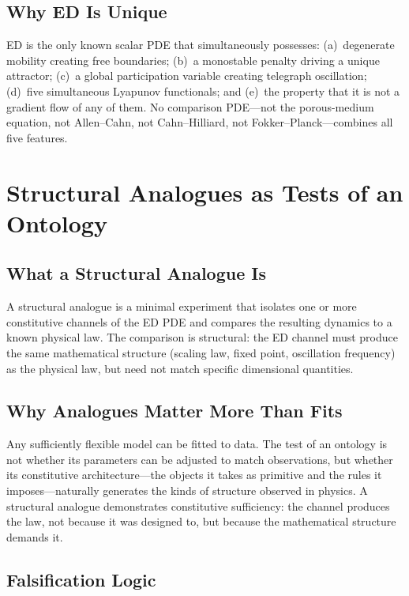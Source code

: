 \documentclass[11pt]{article}
\begin{document}
\subsection{Why ED Is Unique}

ED is the only known scalar PDE that simultaneously possesses: (a)~degenerate mobility creating free boundaries; (b)~a monostable penalty driving a unique attractor; (c)~a global participation variable creating telegraph oscillation; (d)~five simultaneous Lyapunov functionals; and (e)~the property that it is not a gradient flow of any of them. No comparison PDE---not the porous-medium equation, not Allen--Cahn, not Cahn--Hilliard, not Fokker--Planck---combines all five features.

\section{Structural Analogues as Tests of an Ontology}

\subsection{What a Structural Analogue Is}

A structural analogue is a minimal experiment that isolates one or more constitutive channels of the ED PDE and compares the resulting dynamics to a known physical law. The comparison is structural: the ED channel must produce the same mathematical structure (scaling law, fixed point, oscillation frequency) as the physical law, but need not match specific dimensional quantities.

\subsection{Why Analogues Matter More Than Fits}

Any sufficiently flexible model can be fitted to data. The test of an ontology is not whether its parameters can be adjusted to match observations, but whether its constitutive architecture---the objects it takes as primitive and the rules it imposes---naturally generates the kinds of structure observed in physics. A structural analogue demonstrates constitutive sufficiency: the channel produces the law, not because it was designed to, but because the mathematical structure demands it.

\subsection{Falsification Logic}
\end{document}
